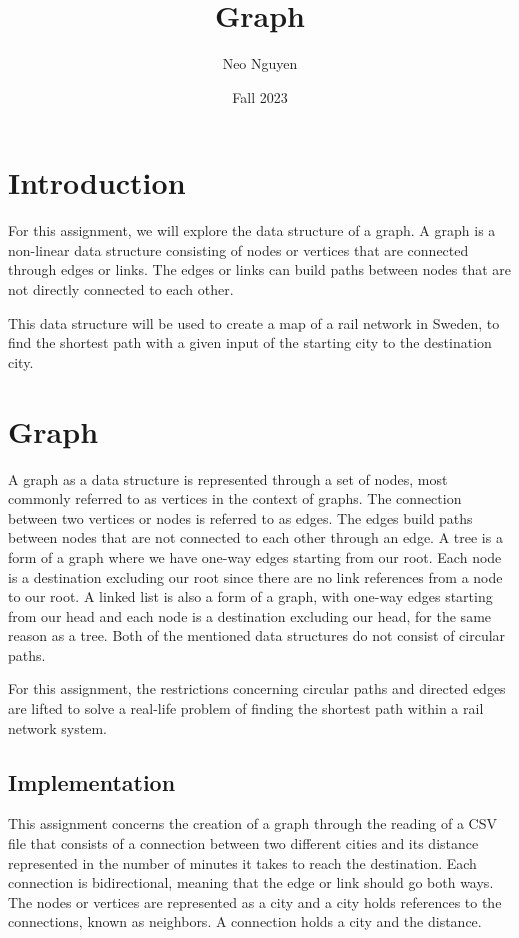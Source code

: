\documentclass[a4paper,11pt]{article}
\begin{document}
\title{
    \textbf{Graph}
}
\author{Neo Nguyen}
\date{Fall 2023}

\maketitle

\section*{Introduction}

    For this assignment, we will explore the data structure of a graph. A graph is a non-linear data structure consisting of nodes or vertices that are connected through edges or links. The edges or links can build paths between nodes that are not directly connected to each other. 

    This data structure will be used to create a map of a rail network in Sweden, to find the shortest path with a given input of the starting city to the destination city.
    
\section*{Graph}

    A graph as a data structure is represented through a set of nodes, most commonly referred to as vertices in the context of graphs. The connection between two vertices or nodes is referred to as edges. The edges build paths between nodes that are not connected to each other through an edge. A tree is a form of a graph where we have one-way edges starting from our root. Each node is a destination excluding our root since there are no link references from a node to our root. A linked list is also a form of a graph, with one-way edges starting from our head and each node is a destination excluding our head, for the same reason as a tree. Both of the mentioned data structures do not consist of circular paths.

    For this assignment, the restrictions concerning circular paths and directed edges are lifted to solve a real-life problem of finding the shortest path within a rail network system.

    \subsection*{Implementation}

        This assignment concerns the creation of a graph through the reading of a CSV file that consists of a connection between two different cities and its distance represented in the number of minutes it takes to reach the destination. Each connection is bidirectional, meaning that the edge or link should go both ways. The nodes or vertices are represented as a city and a city holds references to the connections, known as neighbors. A connection holds a city and the distance.
\end{document}
